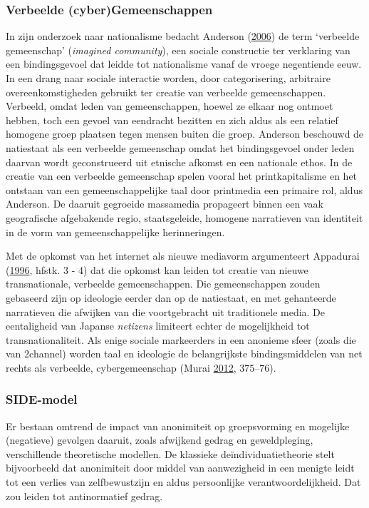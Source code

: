\documentclass[10.5pt,dutch,]{article}
\begin{document}
\subsubsection{Verbeelde
(cyber)Gemeenschappen}\label{verbeelde-cybergemeenschappen}

In zijn onderzoek naar nationalisme bedacht Anderson
(\protect\hyperlink{ref-andersonux5fimaginedux5f2006}{2006}) de term
`verbeelde gemeenschap' (\emph{imagined community}), een sociale
constructie ter verklaring van een bindingsgevoel dat leidde tot
nationalisme vanaf de vroege negentiende eeuw. In een drang naar sociale
interactie worden, door categorisering, arbitraire overeenkomstigheden
gebruikt ter creatie van verbeelde gemeenschappen. Verbeeld, omdat leden
van gemeenschappen, hoewel ze elkaar nog ontmoet hebben, toch een gevoel
van eendracht bezitten en zich aldus als een relatief homogene groep
plaatsen tegen mensen buiten die groep. Anderson beschouwd de natiestaat
als een verbeelde gemeenschap omdat het bindingsgevoel onder leden
daarvan wordt geconstrueerd uit etnische afkomst en een nationale ethos.
In de creatie van een verbeelde gemeenschap spelen vooral het
printkapitalisme en het ontstaan van een gemeenschappelijke taal door
printmedia een primaire rol, aldus Anderson. De daaruit gegroeide
massamedia propageert binnen een vaak geografische afgebakende regio,
staatsgeleide, homogene narratieven van identiteit in de vorm van
gemeenschappelijke herinneringen.

Met de opkomst van het internet als nieuwe mediavorm argumenteert
Appadurai (\protect\hyperlink{ref-appaduraiux5fmodernityux5f1996}{1996},
hfstk. 3 - 4) dat die opkomst kan leiden tot creatie van nieuwe
transnationale, verbeelde gemeenschappen. Die gemeenschappen zouden
gebaseerd zijn op ideologie eerder dan op de natiestaat, en met
gehanteerde narratieven die afwijken van die voortgebracht uit
traditionele media. De eentaligheid van Japanse \emph{netizens}
limiteert echter de mogelijkheid tot transnationaliteit. Als enige
sociale markeerders in een anonieme sfeer (zoals die van 2channel)
worden taal en ideologie de belangrijkste bindingsmiddelen van net
rechts als verbeelde, cybergemeenschap (Murai
\protect\hyperlink{ref-muraiux5fnetux5f2012}{2012}, 375--76).

\subsubsection{SIDE-model}\label{side-model}

Er bestaan omtrend de impact van anonimiteit op groepsvorming en
mogelijke (negatieve) gevolgen daaruit, zoals afwijkend gedrag en
geweldpleging, verschillende theoretische modellen. De klassieke
deïndividuatietheorie stelt bijvoorbeeld dat anonimiteit door middel van
aanwezigheid in een menigte leidt tot een verlies van zelfbewustzijn en
aldus persoonlijke verantwoordelijkheid. Dat zou leiden tot
antinormatief gedrag.
\end{document}

